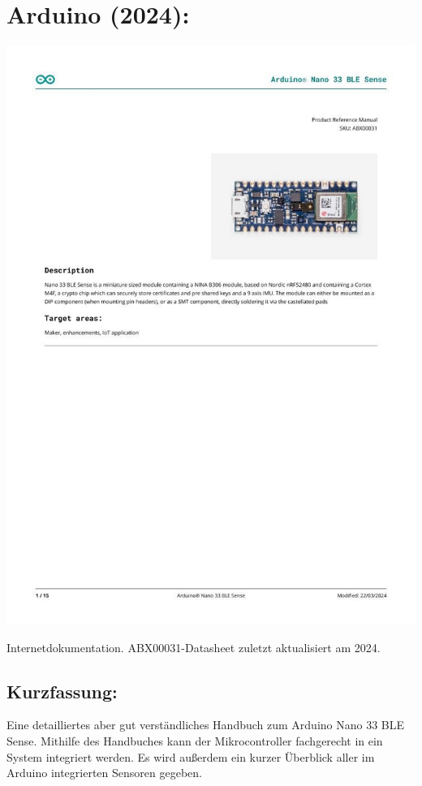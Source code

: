 \section*{Arduino (2024):}
\begin{minipage}{0.5\textwidth}
	\includegraphics[width=\linewidth]{../Appendix/Literaturverzeichnis/img/Arduino.jpg}
\end{minipage}
\hfill
\begin{minipage}{0.48\textwidth}
Internetdokumentation. ABX00031-Datasheet
zuletzt aktualisiert am 2024.
\subsection*{Kurzfassung:}
Eine detailliertes aber gut verständliches Handbuch zum Arduino Nano 33 BLE Sense. Mithilfe des Handbuches kann der Mikrocontroller fachgerecht in ein System integriert werden. Es wird außerdem ein kurzer Überblick aller im Arduino integrierten Sensoren gegeben.	
\end{minipage}
